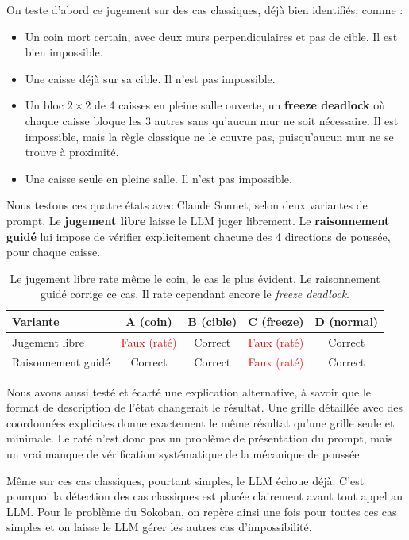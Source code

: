 \documentclass[11pt,a4paper]{article}
\begin{document}
On teste d'abord ce jugement sur des cas classiques, déjà bien
identifiés, comme :

\begin{itemize}
    \item[A.] Un coin mort certain, avec deux murs perpendiculaires et
    pas de cible. Il est bien impossible.
    \item[B.] Une caisse déjà sur sa cible. Il n'est pas impossible.
    \item[C.] Un bloc $2\times2$ de 4 caisses en pleine salle ouverte, un
    \textbf{freeze deadlock} où chaque caisse bloque les 3 autres sans
    qu'aucun mur ne soit nécessaire. Il est impossible, mais la règle
    classique ne le couvre pas, puisqu'aucun mur ne se trouve à
    proximité.
    \item[D.] Une caisse seule en pleine salle. Il n'est pas impossible.
\end{itemize}

Nous testons ces quatre états avec Claude Sonnet, selon deux variantes de prompt. Le \textbf{jugement libre} laisse le LLM juger librement. Le \textbf{raisonnement guidé} lui impose de vérifier explicitement chacune des 4 directions de poussée, pour chaque caisse.

\begin{table}[H]
\centering
\begin{tabular}{@{}lcccc@{}}
\toprule
Variante & A (coin) & B (cible) & C (freeze) & D (normal) \\
\midrule
Jugement libre & \textcolor{red}{Faux (raté)} & Correct & \textcolor{red}{Faux (raté)} & Correct \\
Raisonnement guidé & Correct & Correct & \textcolor{red}{Faux (raté)} & Correct \\
\bottomrule
\end{tabular}
\caption{Le jugement libre rate même le coin, le cas le plus évident. Le
raisonnement guidé corrige ce cas. Il rate cependant encore le
\emph{freeze deadlock}.}
\label{tab:elaguer-batterie}
\end{table}

Nous avons aussi testé et écarté une explication alternative, à savoir que le format de description de l'état changerait le résultat. Une grille détaillée avec des coordonnées explicites donne exactement le même résultat qu'une grille seule et minimale. Le raté n'est donc pas un problème de présentation du prompt, mais un vrai manque de vérification systématique de la mécanique de poussée.

Même sur ces cas classiques, pourtant simples, le LLM échoue déjà. C'est pourquoi la détection des cas classiques est placée clairement avant tout appel au LLM. Pour le problème du Sokoban, on repère ainsi une fois pour toutes ces cas simples et on laisse le LLM gérer les autres cas d'impossibilité.
\end{document}
